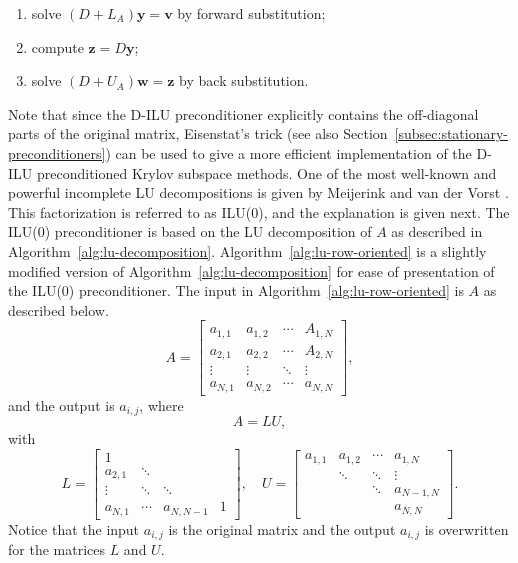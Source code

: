 \begin{enumerate}
\item {solve $(D+L_A)\bm y=\bm v$ by forward substitution;}
\item {compute $\bm z=D\bm y$;}
\item {solve $(D+U_A)\bm w=\bm z$ by back substitution.}
\end{enumerate}
{Note that since the D-ILU preconditioner explicitly contains the off-diagonal parts of the original matrix, Eisenstat's trick  (see also Section\ \ref{subsec:stationary-preconditioners}) can be used to give a more efficient implementation of the D-ILU preconditioned Krylov subspace methods.}
{One of the most well-known and powerful incomplete LU decompositions is given by Meijerink and van der Vorst . This factorization is referred to as ILU(0), and the explanation is given next. The ILU(0) preconditioner is based on the LU decomposition of $A$ as described in Algorithm\ \ref{alg:lu-decomposition}. Algorithm\ \ref{alg:lu-row-oriented} is a slightly modified version of Algorithm\ \ref{alg:lu-decomposition} for ease of presentation of the ILU(0) preconditioner.}
{The input in Algorithm\ \ref{alg:lu-row-oriented} is $A$ as described below.}
\[A=\begin{bmatrix}a_{1,1}&a_{1,2}&\cdots&A_{1,N}\\a_{2,1}&a_{2,2}&\cdots&A_{2,N}\\\vdots&\vdots&\ddots&\vdots\\a_{N,1}&a_{N,2}&\cdots&a_{N,N}\end{bmatrix},\]
{and the output is $a_{i,j}$, where}
\[A=LU,\]
{with}
\[L=\begin{bmatrix}1&&&\\a_{2,1}&\ddots&&\\\vdots&\ddots&\ddots&\\a_{N,1}&\cdots&a_{N,N-1}&1\end{bmatrix},\quad U=\begin{bmatrix}a_{1,1}&a_{1,2}&\cdots&a_{1,N}\\&\ddots&\ddots&\vdots\\&&\ddots&a_{N-1,N}\\&&&a_{N,N}\end{bmatrix}.\]
{Notice that the input $a_{i,j}$ is the original matrix and the output $a_{i,j}$ is overwritten for the matrices $L$ and $U$.}
